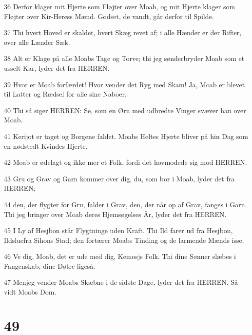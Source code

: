 \par 36 Derfor klager mit Hjerte som Fløjter over Moab, og mit Hjerte klager som Fløjter over Kir-Heress Mænd. Godset, de vandt, går derfor til Spilde.
\par 37 Thi hvert Hoved er skaldet, hvert Skæg revet af; i alle Hænder er der Rifter, over alle Lænder Sæk.
\par 38 Alt er Klage på alle Moabs Tage og Torve; thi jeg sønderbryder Moab som et usselt Kar, lyder det fra HERREN.
\par 39 Hvor er Moab forfærdet! Hvor vender det Ryg med Skam! Ja, Moab er blevet til Latter og Rædsel for alle sine Naboer.
\par 40 Thi så siger HERREN: Se, som en Ørn med udbredte Vinger svæver han over Moab.
\par 41 Kerijot er taget og Borgene faldet. Moabs Heltes Hjerte bliver på hin Dag som en nødstedt Kvindes Hjerte.
\par 42 Moab er ødelagt og ikke mer et Folk, fordi det hovmodede sig mod HERREN.
\par 43 Gru og Grav og Garn kommer over dig, du, som bor i Moab, lyder det fra HERREN;
\par 44 den, der flygter for Gru, falder i Grav, den, der når op af Grav, fanges i Garn. Thi jeg bringer over Moab deres Hjemsøgelses År, lyder det fra HERREN.
\par 45 I Ly af Hesjbon står Flygtninge uden Kraft. Thi Ild farer ud fra Hesjbon, Ildsluefra Sihons Stad; den fortærer Moabs Tinding og de larmende Mænds isse.
\par 46 Ve dig, Moab, det er ude med dig, Kemosjs Folk. Thi dine Sønner slæbes i Fangenskab, dine Døtre ligeså.
\par 47 Menjeg vender Moabs Skæbne i de sidste Dage, lyder det fra HERREN. Så vidt Moabs Dom.

\chapter{49}

